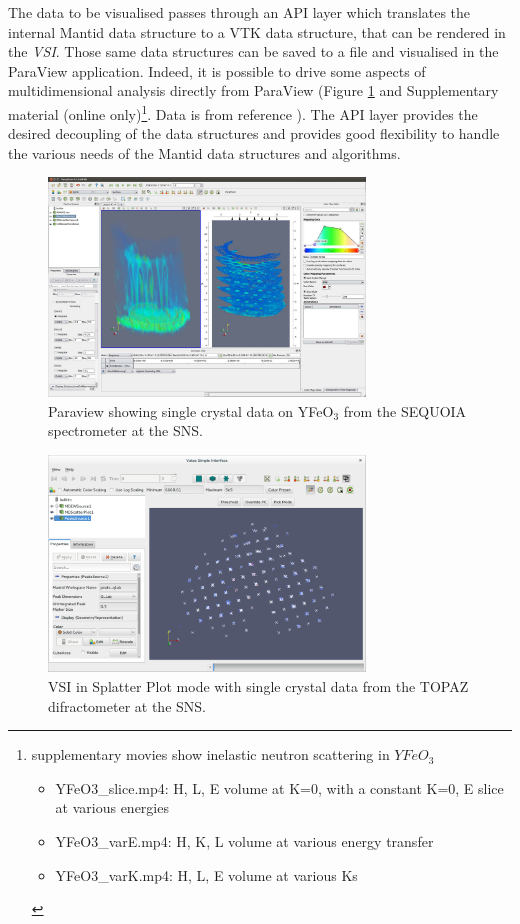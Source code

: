 \documentclass[1p]{elsarticle}
\begin{document}
The data to be visualised passes through an API layer which translates the internal Mantid data structure to a VTK\cite{vtk} data structure, that can be rendered in the \textit{VSI}. Those same data structures can be saved to a file and visualised in the ParaView application. Indeed, it is possible to drive some aspects of multidimensional analysis directly from ParaView (Figure \ref{fig:PV} and Supplementary material (online only)\footnote{supplementary movies show inelastic neutron scattering in $YFeO_3$
\begin{itemize}
\item YFeO3\_slice.mp4: H, L, E volume at K=0, with a constant K=0, E slice at various energies
\item YFeO3\_varE.mp4: H, K, L volume at various energy transfer
\item YFeO3\_varK.mp4: H, L, E volume at various Ks
\end{itemize}
}. Data is from reference \cite{YFeO3}). The API layer provides the desired decoupling of the data structures and provides good flexibility to handle the various needs of the Mantid data structures and algorithms. 

\begin{figure}[ht]
\centerline{\includegraphics[width=0.75\textwidth]{ParaviewYFeO3.pdf}}
\caption{Paraview showing single crystal data\cite{YFeO3} on YFeO$_3$ from the SEQUOIA spectrometer at the SNS.}
\label{fig:PV}
\end{figure}

\begin{figure}[!ht]
\centerline{\includegraphics[width=0.75\textwidth]{VSISplatterPlot.pdf}}
\caption{VSI in Splatter Plot mode with single crystal data from the TOPAZ difractometer at the SNS.}
\label{fig:VSI_sample}
\end{figure}
\end{document}
